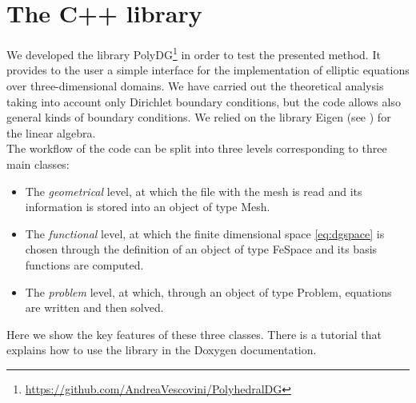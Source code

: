 \documentclass[12pt, a4paper]{article}
\newcommand{\code}[1]{{\footnotesize\ttfamily #1}}
\theoremstyle{definition}
\theoremstyle{plain}
\theoremstyle{plain}
\theoremstyle{definition}
\begin{document}
\section{The C++ library}\label{sec:lib}
We developed the library PolyDG\footnote{\url{https://github.com/AndreaVescovini/PolyhedralDG}} in order to test the presented method. It provides to the user a simple interface for the implementation of elliptic equations over
three-dimensional domains. We have carried out the theoretical analysis taking 
into account only Dirichlet boundary conditions, but the code allows also 
general kinds of boundary conditions. We relied on the library Eigen (see 
\cite{eigen}) for the linear algebra.\\
The workflow of the code can be split into three levels corresponding to three 
main classes:
\begin{itemize}
	\item The \emph{geometrical} level, at which the file with the mesh is read and its information is stored into an object of type \code{Mesh}.
	\item The \emph{functional} level, at which the finite dimensional space \eqref{eq:dgspace} is chosen through the definition of an object of type \code{FeSpace} and its basis functions are computed.
	\item The \emph{problem} level, at which, through an object of type \code{Problem}, equations are written and then solved.
\end{itemize}
Here we show the key features of these three classes. There is a tutorial that 
explains how to use the library in the Doxygen documentation.
\end{document}
